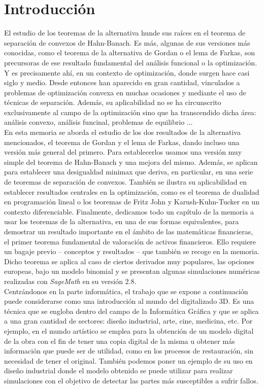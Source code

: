 \chapter{Introducción}
El estudio de los teoremas de la alternativa hunde sus raíces en el teorema de separación de convexos de Hahn-Banach. Es más, algunas de sus versiones más conocidas, como el teorema de la alternativa de Gordan o el lema de Farkas, son precursoras de ese resultado fundamental del análisis funcional o la optimización. Y es precisamente ahí, en un contexto de optimización, donde surgen hace casi siglo y medio. Desde entonces han aparecido en gran cantidad, vinculados a problemas de optimización convexa en muchas ocasiones y mediante el uso de técnicas de separación. Además, su aplicabilidad no se ha circunscrito exclusivamente al campo de la optimización sino que ha transcendido dicha área: análisis convexo, análisis funcinal, problemas de equilibrio $ \dots $ \\

En esta memoria se aborda el estudio de los dos resultados de la alternativa mencionados, el teorema de Gordan y el lema de Farkas, dando incluso una versión más general del primero. Para establecerlos usamos una versión muy simple del teorema de Hahn-Banach y una mejora del mismo. Además, se aplican para establecer una desigualdad minimax que deriva, en particular, en una serie de teoremas de separación de convexos. También se ilustra su aplicabilidad en establecer resultados centrales en la optimización, como es el teorema de dualidad en programación lineal o los teoremas de Fritz John y Karush-Kuhn-Tucker en un contexto diferenciable. Finalmente, dedicamos todo un capítulo de la memoria a usar los teoremas de la alternativa, en una de sus formas equivalentes, para demostrar un resultado importante en el ámbito de las matemáticas financieras, el primer teorema fundamental de valoración de activos financieros. Ello requiere un bagaje previo -- conceptos y resultados -- que también se recoge en la memoria. Dicho teorema se aplica al caso de ciertos derivados muy populares, las opciones europeas, bajo un modelo binomial y se presentan algunas simulaciones numéricas realizadas con \textit{SageMath} en su versión 2.8. \\

Centrándonos en la parte informática, el trabajo que se expone a continuación puede considerarse como una introducción al mundo del digitalizado 3D. Es una técnica que se engloba dentro del campo de la Informática Gráfica y que se aplica a una gran cantidad de sectores: diseño industrial, arte, cine, medicina, etc. Por ejemplo, en el mundo artístico se emplea para la obtención de un modelo digital de la obra con el fin de tener una copia digital de la misma u obtener más información que puede ser de utilidad, como en los procesos de restauración, sin necesidad de tener el original. También podemos poner un ejemplo de su uso en diseño industrial donde el modelo obtenido se puede utilizar para realizar simulaciones con el objetivo de detectar las partes más susceptibles a sufrir fallos. \\

